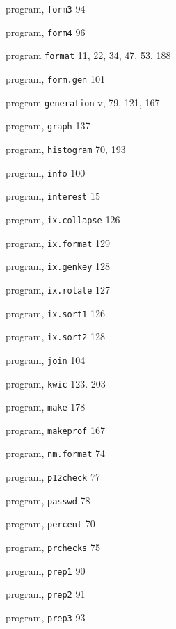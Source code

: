 \begin{multicols}{3}
\hangindent=3pc  program, \verb'form3' 94

\hangindent=3pc  program, \verb'form4' 96

\hangindent=3pc  program \verb'format' 11, 22, 34, 47, 53, 188

\hangindent=3pc  program, \verb'form.gen' 101

\hangindent=3pc  program \verb'generation' v, 79, 121, 167

\hangindent=3pc  program, \verb'graph' 137

\hangindent=3pc  program, \verb'histogram' 70, 193

\hangindent=3pc  program, \verb'info' 100

\hangindent=3pc  program, \verb'interest' 15

\hangindent=3pc  program, \verb'ix.collapse' 126

\hangindent=3pc  program, \verb'ix.format' 129

\hangindent=3pc  program, \verb'ix.genkey' 128

\hangindent=3pc  program, \verb'ix.rotate' 127

\hangindent=3pc  program, \verb'ix.sort1' 126

\hangindent=3pc  program, \verb'ix.sort2' 128

\hangindent=3pc  program, \verb'join' 104

\hangindent=3pc  program, \verb'kwic' 123. 203

\hangindent=3pc  program, \verb'make' 178

\hangindent=3pc  program, \verb'makeprof' 167

\hangindent=3pc  program, \verb'nm.format' 74

\hangindent=3pc  program, \verb'p12check' 77

\hangindent=3pc  program, \verb'passwd' 78

\hangindent=3pc  program, \verb'percent' 70

\hangindent=3pc  program, \verb'prchecks' 75

\hangindent=3pc  program, \verb'prep1' 90

\hangindent=3pc  program, \verb'prep2' 91

\hangindent=3pc  program, \verb'prep3' 93


\end{multicols}
